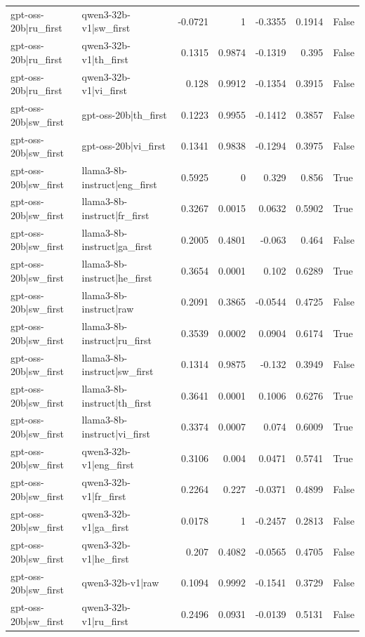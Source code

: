 \begin{table}
\begin{tabular}{l l r r r r l}
gpt-oss-20b|ru_first & qwen3-32b-v1|sw_first & -0.0721 & 1 & -0.3355 & 0.1914 & False \\
gpt-oss-20b|ru_first & qwen3-32b-v1|th_first & 0.1315 & 0.9874 & -0.1319 & 0.395 & False \\
gpt-oss-20b|ru_first & qwen3-32b-v1|vi_first & 0.128 & 0.9912 & -0.1354 & 0.3915 & False \\
gpt-oss-20b|sw_first & gpt-oss-20b|th_first & 0.1223 & 0.9955 & -0.1412 & 0.3857 & False \\
gpt-oss-20b|sw_first & gpt-oss-20b|vi_first & 0.1341 & 0.9838 & -0.1294 & 0.3975 & False \\
gpt-oss-20b|sw_first & llama3-8b-instruct|eng_first & 0.5925 & 0 & 0.329 & 0.856 & True \\
gpt-oss-20b|sw_first & llama3-8b-instruct|fr_first & 0.3267 & 0.0015 & 0.0632 & 0.5902 & True \\
gpt-oss-20b|sw_first & llama3-8b-instruct|ga_first & 0.2005 & 0.4801 & -0.063 & 0.464 & False \\
gpt-oss-20b|sw_first & llama3-8b-instruct|he_first & 0.3654 & 0.0001 & 0.102 & 0.6289 & True \\
gpt-oss-20b|sw_first & llama3-8b-instruct|raw & 0.2091 & 0.3865 & -0.0544 & 0.4725 & False \\
gpt-oss-20b|sw_first & llama3-8b-instruct|ru_first & 0.3539 & 0.0002 & 0.0904 & 0.6174 & True \\
gpt-oss-20b|sw_first & llama3-8b-instruct|sw_first & 0.1314 & 0.9875 & -0.132 & 0.3949 & False \\
gpt-oss-20b|sw_first & llama3-8b-instruct|th_first & 0.3641 & 0.0001 & 0.1006 & 0.6276 & True \\
gpt-oss-20b|sw_first & llama3-8b-instruct|vi_first & 0.3374 & 0.0007 & 0.074 & 0.6009 & True \\
gpt-oss-20b|sw_first & qwen3-32b-v1|eng_first & 0.3106 & 0.004 & 0.0471 & 0.5741 & True \\
gpt-oss-20b|sw_first & qwen3-32b-v1|fr_first & 0.2264 & 0.227 & -0.0371 & 0.4899 & False \\
gpt-oss-20b|sw_first & qwen3-32b-v1|ga_first & 0.0178 & 1 & -0.2457 & 0.2813 & False \\
gpt-oss-20b|sw_first & qwen3-32b-v1|he_first & 0.207 & 0.4082 & -0.0565 & 0.4705 & False \\
gpt-oss-20b|sw_first & qwen3-32b-v1|raw & 0.1094 & 0.9992 & -0.1541 & 0.3729 & False \\
gpt-oss-20b|sw_first & qwen3-32b-v1|ru_first & 0.2496 & 0.0931 & -0.0139 & 0.5131 & False \\

\end{tabular}
\end{table}
